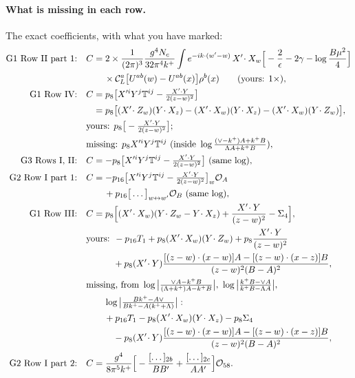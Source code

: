 \documentclass[10pt]{article}
\numberwithin{equation}{section}
\newcommand{\CL}{\mathcal C_L}
\newcommand{\OO}{\mathcal O}
\newcommand{\pre}{\frac{1}{(2\pi)^3}}
\newcommand{\phw}{e^{-ik\cdot(w'-w)}}
\begin{document}
\paragraph{What is missing in each row.} The exact coefficients, with what you have marked:
\begin{align}
\text{G1 Row II part 1:}\quad&C=2\times\pre\frac{g^4N_c}{32\pi^4k^+}\int\phw\,X'\!\cdot X_w\Big[-\frac2\epsilon-2\gamma-\log\frac{B\mu^2}{4}\Big]\notag\\
&\qquad\times\CL^a\big[U^{ab}(w)-U^{ab}(x)\big]\rho^b(x)\qquad(\text{yours: }1\times),\\
\text{G1 Row IV:}\quad&C=p_8\big[X'^iY^j\mathbb T^{ij}-\tfrac{X'\cdot Y}{2(z-w)^2}\big]\notag\\
&\phantom{C}=p_8\big[(X'\!\cdot Z_w)(Y\!\cdot X_z)-(X'\!\cdot X_w)(Y\!\cdot X_z)-(X'\!\cdot X_w)(Y\!\cdot Z_w)\big],\notag\\
&\text{yours: }p_8\big[-\tfrac{X'\cdot Y}{2(z-w)^2}\big];\notag\\
&\text{missing: }p_8X'^iY^j\mathbb T^{ij}\ (\text{inside }\log\tfrac{(\vee-k^+)A+k^+B}{\Lambda A+k^+B}),\\
\text{G3 Rows I, II:}\quad&C=-p_8\big[X'^iY^j\mathbb T^{ij}-\tfrac{X'\cdot Y}{2(z-w)^2}\big]\ \text{(same log)},\\
\text{G2 Row I part 1:}\quad&C=-p_{16}\big[X'^iY^j\mathbb T^{ij}-\tfrac{X'\cdot Y}{2(z-w)^2}\big]_{w}\OO_A\notag\\
&\qquad+p_{16}\big[\dots\big]_{w\leftrightarrow w'}\OO_B\ \text{(same log)},\\
\text{G1 Row III:}\quad&C=p_8\Big[(X'\!\cdot X_w)(Y\!\cdot Z_w-Y\!\cdot X_z)+\frac{X'\!\cdot Y}{(z-w)^2}-\Sigma_4\Big],\notag\\
&\text{yours: }-p_{16}T_1+p_8(X'\!\cdot X_w)(Y\!\cdot Z_w)+p_8\frac{X'\!\cdot Y}{(z-w)^2}\notag\\
&\qquad\quad+p_8(X'\!\cdot Y)\frac{[(z-w)\cdot(x-w)]A-[(z-w)\cdot(x-z)]B}{(z-w)^2(B-A)^2},\notag\\
&\text{missing, from }\log\big|\tfrac{\vee A-k^+B}{(\Lambda+k^+)A-k^+B}\big|,\ \log\big|\tfrac{k^+B-\vee A}{k^+B-\Lambda A}\big|,\notag\\
&\qquad\log\big|\tfrac{Bk^+-A\vee}{Bk^+-A(k^++\Lambda)}\big|:\notag\\
&\qquad+p_{16}T_1-p_8(X'\!\cdot X_w)(Y\!\cdot X_z)-p_8\Sigma_4\notag\\
&\qquad\quad-p_8(X'\!\cdot Y)\frac{[(z-w)\cdot(x-w)]A-[(z-w)\cdot(x-z)]B}{(z-w)^2(B-A)^2},\\
\text{G2 Row I part 2:}\quad&C=\frac{g^4}{8\pi^5k^+}\Big[-\frac{[\dots]_{2b}}{BB'}+\frac{[\dots]_{2c}}{AA'}\Big]\OO_{58}.
\end{align}
\end{document}
